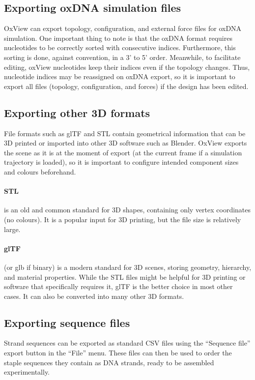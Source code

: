 \subsection{Exporting oxDNA simulation files}
OxView can export topology, configuration, and external force files for oxDNA simulation. 
One important thing to note is that the oxDNA format requires nucleotides to be correctly sorted with consecutive indices. Furthermore, this sorting is done, against convention, in a 3' to 5' order. Meanwhile, to facilitate editing, oxView nucleotides keep their indices even if the topology changes. Thus, nucleotide indices may be reassigned on oxDNA export, so it is important to export all files (topology, configuration, and forces) if the design has been edited.

\subsection{Exporting other 3D formats}
File formats such as glTF and STL contain geometrical information that can be 3D printed or imported into other 3D software such as Blender. OxView exports the scene as it is at the moment of export (at the current frame if a simulation trajectory is loaded), so it is important to configure intended component sizes and colours beforehand.

\paragraph{STL} is an old and common standard for 3D shapes, containing only vertex coordinates (no colours). It is a popular input for 3D printing, but the file size is relatively large.

\paragraph{glTF} (or glb if binary) is a modern standard for 3D scenes, storing geometry, hierarchy, and material properties. While the STL files might be helpful for 3D printing or software that specifically requires it, glTF is the better choice in most other cases. It can also be converted into many other 3D formats.

\subsection{Exporting sequence files}
Strand sequences can be exported as standard CSV files using the ``Sequence file'' export button in the ``File'' menu. These files can then be used to order the staple sequences they contain as DNA strands, ready to be assembled experimentally.

